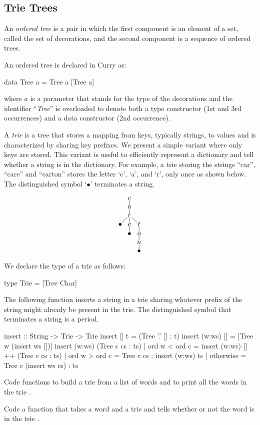 \subsection{Trie Trees}

An \emph{ordered tree} is a pair
in which the first component is an element of a set,
called the set of decorations, and the second component
is a sequence of ordered trees.

\medskip\noindent
An ordered tree is declared in Curry as:
%
\begin{prog}
data Tree a = Tree a [Tree a]
\end{prog}
%
where $a$ is a parameter that stands for the type of the
decorations and the identifier ``\emph{Tree}'' is overloaded to
denote both a type constructor (1st and 3rd occurrences)
and a data constructor (2nd occurrence).

A \emph{trie} is a tree that stores a mapping from keys,
typically strings, to values and is characterized by sharing
key prefixes.  We present a simple variant where only keys
are stored.  This variant is useful to efficiently
represent a dictionary and tell whether a string is
in the dictionary.
%
For example, a trie storing the strings ``car'', ``care''
and ``carton'' stores the letter `c', `a', and `r', only
once as shown below.  The distinguished symbol `$\bullet$'
terminates a string.

$$
\xymatrix@1@C=6pt@R=6pt@M=1pt{
  & c \ar@{-}[d] \\  
  & a \ar@{-}[d] \\  
  & r \ar@{-}[dl]\ar@{-}[d]\ar@{-}[dr] \\  
  \bullet & e \ar@{-}[d] & t \ar@{-}[d] \\
  & \bullet & o \ar@{-}[d] \\  
  & & n \ar@{-}[d] \\  
  & & \bullet
}
$$

\noindent
We declare the type of a trie as follows:
%
\begin{prog}
type Trie = [Tree Char]
\end{prog}
%
The following function inserts a string in a trie
sharing whatever prefix of the string might already be present in the trie.
The distinguished symbol that terminates a string is a period.
%
\begin{prog}
insert :: String -> Trie -> Trie
insert [] t = (Tree '.' [] : t)
insert (w:ws) [] = [Tree w (insert ws [])]
insert (w:ws) (Tree c cs : ts)
  | ord w < ord c = insert (w:ws) [] ++ (Tree c cs : ts)
  | ord w > ord c = Tree c cs : insert (w:ws) ts
  | otherwise = Tree c (insert ws cs) : ts
\end{prog}
%
\begin{exercise}
Code functions to build a trie from a list of words
and to print all the words in the trie
.
\end{exercise}
%
\begin{exercise}
Code a function that takes a word and a trie and tells
whether or not the word is in the trie
.
\end{exercise}

